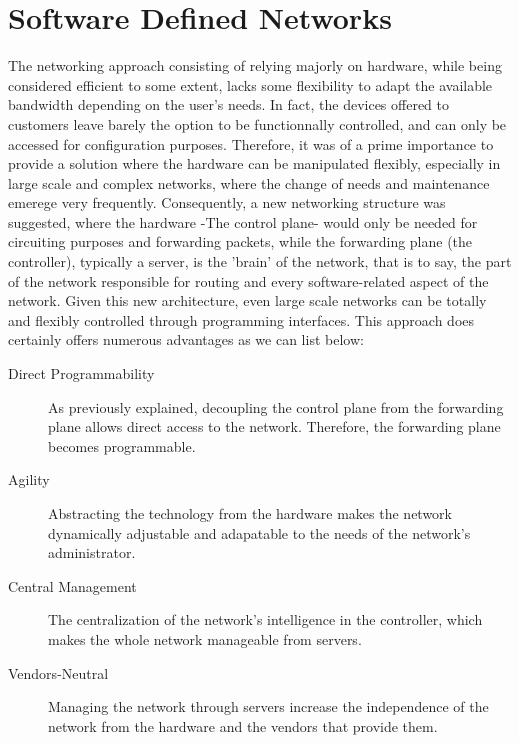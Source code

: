 \section{Software Defined Networks}
The networking approach consisting of relying majorly on hardware, while being considered efficient to some extent, lacks some flexibility to adapt the available bandwidth depending on the user’s needs. In fact, the devices offered to customers leave barely the option to be functionnally controlled, and can only be accessed for configuration purposes. Therefore, it was of a prime
importance to provide a solution where the hardware can be manipulated flexibly, especially in large scale and complex networks, where the change of needs and maintenance emerege very frequently. Consequently, a new networking structure was suggested, where the hardware -The control plane- would only be needed for circuiting purposes and forwarding packets, while the forwarding plane (the controller), typically a server, is the ’brain’ of the network, that is to say, the part of the network responsible for routing and every software-related aspect of the network. Given this new architecture, even
large scale networks can be totally and flexibly controlled through programming interfaces. This approach does certainly offers numerous advantages as we can list below:
\begin{description}
\item[Direct Programmability] As previously explained, decoupling the control plane from the forwarding plane allows direct access to the network. Therefore, the forwarding plane becomes programmable.
\item[Agility] Abstracting the technology from the hardware makes the network dynamically adjustable and adapatable to the needs of the network’s administrator.
\item[Central Management] The centralization of the network’s intelligence in the controller, which makes the whole network manageable from servers.
\item[Vendors-Neutral] Managing the network through servers increase the independence of the network from the hardware and the vendors that provide them.
\end{description}
